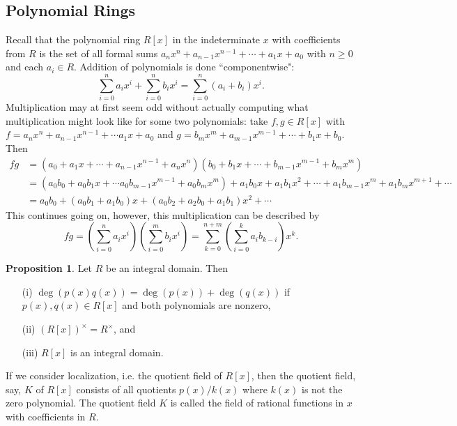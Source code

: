 \documentclass[9pt,reqno]{amsart}
\theoremstyle{definition}
\newtheorem{prop}{Proposition}[section]
\begin{document}
\subsection{Polynomial Rings}

Recall that the polynomial ring $R[x]$ in the indeterminate $x$ with coefficients from $R$ is the set of all formal sums $a_n x^n + a_{n-1} x^{n-1} + \cdots + a_1 x + a_0$ with $n \geq 0$ and each $a_i \in R$. Addition of polynomials is done ``componentwise": $$\sum_{i=0}^n a_i x^i +\sum_{i=0}^n b_i x^i = \sum_{i = 0}^n (a_i + b_i)x^i. $$
Multiplication may at first seem odd without actually computing what multiplication might look like for some two polynomials: take $f, g \in R[x]$ with $f = a_n x^n + a_{n-1}x^{n-1} + \cdots a_1 x +a_0$ and $g = b_m x^m + a_{m-1} x^{m-1} + \cdots + b_1 x + b_0$. Then 
\begin{align}
	f g &= (a_0 + a_1 x + \cdots +a_{n-1} x^{n-1} + a_n x^n )  (b_0 + b_1 x +\cdots + b_{m-1} x^{m-1} + b_mx^m) \\
	&= (a_0b_0 + a_0 b_1 x + \cdots a_0 b_{m-1} x^{m-1} + a_0 b_m x^m )+ a_1 b_0 x + a_1 b_1 x^2 + \cdots + a_1 b_{m-1} x^m + a_1 b_m x^{m+1} + \cdots  \\ 
	&= a_0 b_0 + (a_0 b_1 + a_1 b_0 )x + (a_0b_2 + a_2 b_0 + a_1 b_1) x^2 + \cdots
\end{align}
This continues going on, however, this multiplication can be described by 
$$fg = \left (\sum_{i= 0}^n a_i x^i \right) \left ( \sum_{i=0}^m b_i x^i \right) = \sum_{k=0}^{n+m} \left (\sum_{i=0}^k a_i b_{k-i} \right) x^k.$$


\begin{prop}
	Let $R$ be an integral domain. Then 
	\begin{itemize}
		\item[(i)] $\deg (p(x) q(x)) = \deg (p(x)) + \deg (q(x)) $ if $p(x), q(x) \in R[x]$ and both polynomials are nonzero, 
		\item[(ii)] $(R[x])^\times = R^\times$, and 
		\item[(iii)] $R[x]$ is an integral domain.
	\end{itemize}
\end{prop}

If we consider localization, i.e. the quotient field of $R[x]$, then the quotient field, say, $K$ of $R[x]$ consists of all quotients $p(x)/k(x)$ where $k(x)$ is not the zero polynomial. The quotient field $K$ is called the field of rational functions in $x$ with coefficients in $R$. 
\end{document}
